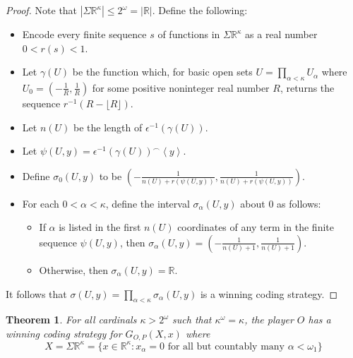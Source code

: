 \documentclass[11pt]{article}
\theoremstyle{plain}
\newtheorem{theorem}{Theorem}
\theoremstyle{definition}
\theoremstyle{remark}
\begin{document}
\begin{proof}
Note that $|\Sigma\mathbb{R}^\kappa| \leq 2^\omega = |\mathbb{R}|$. Define the following:

    \begin{itemize}
    \item Encode every finite sequence $s$ of functions in $\Sigma\mathbb{R}^{\kappa}$ as a real number $0<r(s)<1$. 
    \item Let $\gamma(U)$ be the function which, for basic open sets $U=\prod_{\alpha<\kappa}U_\alpha$ where $U_0=(-\frac{1}{R},\frac{1}{R})$ for some positive noninteger real number $R$, returns the sequence $r^{-1}(R-\lfloor R\rfloor)$.
    \item Let $n(U)$ be the length of $\epsilon^{-1}(\gamma(U))$.
    \item Let $\psi(U,y)=\epsilon^{-1}(\gamma(U))^\frown\left<y\right>$.
    \item Define $\sigma_0(U,y)$ to be $\left(-\frac{1}{n(U)+r(\psi(U,y))},\frac{1}{n(U)+r(\psi(U,y))}\right)$.
    \item For each $0<\alpha<\kappa$, define the interval $\sigma_\alpha(U,y)$ about $0$ as follows:
        \begin{itemize}
        \item If $\alpha$ is listed in the first $n(U)$ coordinates of any term in the finite sequence $\psi(U,y)$, then $\sigma_\alpha(U,y)=(-\frac{1}{n(U)+1},\frac{1}{n(U)+1})$.
        \item Otherwise, then $\sigma_\alpha(U,y)=\mathbb{R}$.
        \end{itemize}
    \end{itemize}

It follows that $\sigma(U,y)=\prod_{\alpha<\kappa} \sigma_\alpha(U,y)$ is a winning coding strategy.
\end{proof}

\begin{theorem}
For all cardinals $\kappa>2^\omega$ such that $\kappa^\omega = \kappa$, the player $O$ has a winning coding strategy for $G_{O,P}(X,x)$ where \[X=\Sigma\mathbb{R}^{\kappa}=\{x\in \mathbb{R}^{\kappa}: x_\alpha = 0 \text{ for all but countably many } \alpha<\omega_1\}\]
\end{theorem}
\end{document}

